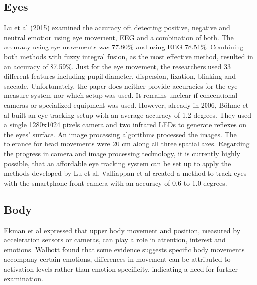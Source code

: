 \subsection{Eyes}
Lu et al (2015) \cite{lu2015combining} examined the accuracy oft detecting positive, negative and neutral emotion using eye movement, EEG and a combination of both. The accuracy using eye movements was 77.80\% and using EEG 78.51\%. Combining both methods with fuzzy integral fusion, as the most effective method, resulted in an accuracy of 87.59\%. Just for the eye movement, the researchers used 33 different features including pupil diameter, dispersion, fixation, blinking and saccade. Unfortunately, the paper does neither provide accuracies for the eye measure system nor which setup was used. It remains unclear if concentional cameras or specialized equipment was used.
However, already in 2006, Böhme et al \cite{bohme2006remote} built an eye tracking setup with an average accuracy of 1.2 degrees. They used a single 1280x1024 pixels camera and two infrared LEDs to generate reflexes on the eyes' surface. An image processing algorithms processed the images. The tolerance for head movements were 20 cm along all three spatial axes. Regarding the progress in camera and image processing technology, it is currently highly possible, that an affordable eye tracking system can be set up to apply the methods developed by Lu et al.
Valliappan et al \cite{valliappan2020accelerating} created a method to track eyes with the smartphone front camera with an accuracy of 0.6 to 1.0 degrees.

\subsection{Body}
Ekman et al expressed that upper body movement and position, measured by acceleration sensors or cameras, can play a role in attention, interest and emotions\cite{ekman2012social}. Walbott \cite{wallbott1998bodily} found that some evidence suggests specific body movements accompany certain emotions, differences in movement can be attributed to activation levels rather than emotion specificity, indicating a need for further examination.

